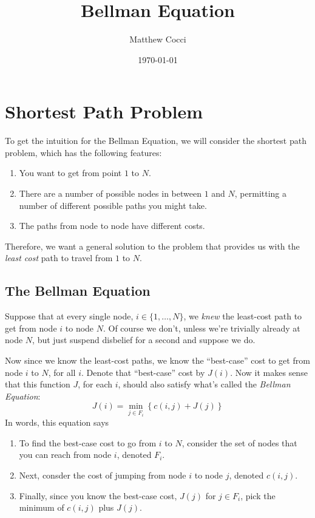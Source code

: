 \documentclass[a4paper,12pt]{scrartcl}
\author{Matthew Cocci}
\title{Bellman Equation}
\date{\today}
\begin{document}
\maketitle



\section{Shortest Path Problem}

To get the intuition for the Bellman Equation, we will consider the shortest path problem, which has the following features:
\begin{enumerate}

    \item You want to get from point $1$ to $N$.

    \item There are a number of possible nodes in between $1$ and $N$,
	permitting a number of different possible paths you might take.

    \item The paths from node to node have different costs.

\end{enumerate}

Therefore, we want a general solution to the problem that
provides us with the \emph{least cost} path to travel from
$1$ to $N$. 


\subsection{The Bellman Equation}

Suppose that at every single node, $i \in \{1, \ldots, N\}$, we \emph{knew}
the least-cost path to get from node $i$ to node $N$. Of course we don't,
unless we're trivially already at node $N$, but just suspend disbelief for
a second and suppose we do.

Now since we know the least-cost paths, we know the ``best-case'' cost to
get from node $i$ to $N$, for all $i$. Denote that ``best-case'' cost
by $J(i)$. Now it makes sense that this function
$J$, for each $i$, should also satisfy what's called the
\emph{Bellman Equation}:
\begin{equation}
    \label{bellman}
    J(i) = \min_{j \in F_i} \left\{ c(i, j) + J(j) \right\}
\end{equation}
In words, this equation says
\begin{enumerate}
    \item To find the best-case cost to go from $i$
	to $N$, consider the set of nodes that you can reach from node $i$,
	denoted $F_i$.

    \item Next, consder the cost of jumping from node $i$ to node $j$,
	denoted $c(i,j)$.

    \item Finally, since you know the best-case cost,
	$J(j)$ for $j \in F_i$, pick the minimum of $c(i,j)$ plus $J(j)$.
\end{enumerate} 
\end{document}
